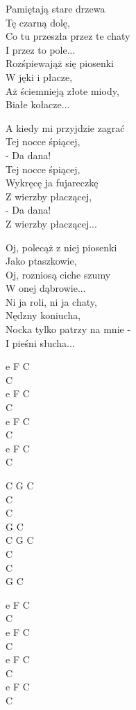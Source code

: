 \begin{text}
    Pamiętają stare drzewa\\
    Tę czarną dolę,\\
    Co tu przeszła przez te chaty\\
    I przez to pole...\\
    Rozśpiewająż się piosenki\\
    W jęki i płacze,\\
    Aż ściemnieją złote miody,\\
    Białe kołacze...

A kiedy mi przyjdzie zagrać\\
Tej nocce śpiącej,\\
- Da dana!\\
Tej nocce śpiącej,\\
Wykręcę ja fujareczkę\\
Z wierzby płaczącej,\\
- Da dana!\\
Z wierzby płaczącej...

Oj, polecąż z niej piosenki\\
Jako ptaszkowie,\\
Oj, rozniosą ciche szumy\\
W onej dąbrowie...\\
Ni ja roli, ni ja chaty,\\
Nędzny koniucha,\\
Nocka tylko patrzy na mnie -\\
I pieśni słucha...
\end{text}
\begin{chord}
    e F C\\
    C\\
    e F C\\
    C\\
    e F C\\
    C\\
    e F C\\
    C

    C G C\\
    C\\
    C\\
    G C\\
    C G C\\
    C\\
    C\\
    G C

    e F C\\
    C\\
    e F C\\
    C\\
    e F C\\
    C\\
    e F C\\
    C
\end{chord}